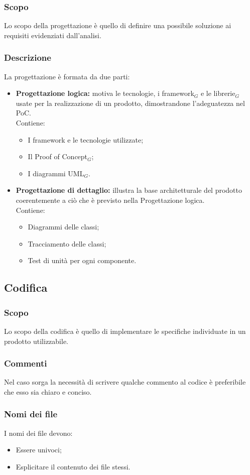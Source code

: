   \subsubsection{Scopo}
  Lo scopo della progettazione è quello di definire una possibile soluzione ai requisiti evidenziati dall'analisi.
  \subsubsection{Descrizione}
  La progettazione è formata da due parti:
  \begin{itemize}
    \item \textbf{Progettazione logica:} motiva le tecnologie, i framework$_G$ e le librerie$_G$ usate per la realizzazione di un prodotto, dimostrandone l'adeguatezza nel PoC.
    \\Contiene:
    \begin{itemize}
      \item I framework e le tecnologie utilizzate;
      \item Il Proof of Concept$_G$;
      \item I diagrammi UML$_G$.
    \end{itemize}
    \item \textbf{Progettazione di dettaglio:} illustra la base architetturale del prodotto coerentemente a ciò che è previsto nella Progettazione logica.
    \\Contiene:
    \begin{itemize}
      \item Diagrammi delle classi;
      \item Tracciamento delle classi;
      \item Test di unità per ogni componente.
    \end{itemize}
  \end{itemize}

  \subsection{Codifica}
  \subsubsection{Scopo}
  Lo scopo della codifica è quello di implementare le specifiche individuate in un prodotto utilizzabile.
  \subsubsection{Commenti}
  Nel caso sorga la necessità di scrivere qualche commento al codice è preferibile che esso sia chiaro e conciso.
  \subsubsection{Nomi dei file}
  I nomi dei file devono:
  \begin{itemize}
    \item Essere univoci;
    \item Esplicitare il contenuto dei file stessi.
  \end{itemize}

